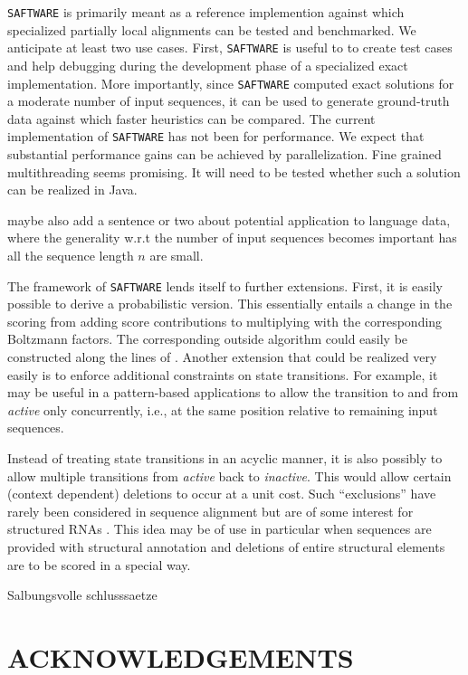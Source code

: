 \documentclass[a4paper,10pt]{article}
\let\cite\citep
\newcommand{\TODO}[1]{\begingroup\color{red}#1\endgroup}
\newcommand{\PFS}[1]{\begingroup\color{green}#1\endgroup}
\newcommand{\FK}[1]{\begingroup\color{blue}#1\endgroup}
\newcommand{\SAFTWARE}{\TODO{\texttt{SAFTWARE}}}
\begin{document}
\PFS{%
  \SAFTWARE{} is primarily meant as a reference implemention against which
  specialized partially local alignments can be tested and benchmarked. We
  anticipate at least two use cases. First, \SAFTWARE{} is useful to to
  create test cases and help debugging during the development phase of a
  specialized exact implementation. More importantly, since \SAFTWARE{}
  computed exact solutions for a moderate number of input sequences, it can
  be used to generate ground-truth data against which faster heuristics can
  be compared. \FK{ The current implementation of \SAFTWARE{} has not been
    for performance.  We expect that substantial performance gains can be
    achieved by parallelization. Fine grained multithreading
    \cite{Martins:01} seems promising. It will need to be tested whether
    such a solution can be realized in Java.}

  \TODO{maybe also add a sentence or two about potential application to
    language data, where the generality w.r.t the number of input sequences
    becomes important has all the sequence length $n$ are small.}

  The framework of \SAFTWARE{} lends itself to further extensions. First,
  it is easily possible to derive a probabilistic version. This essentially
  entails a change in the scoring from adding score contributions to
  multiplying with the corresponding Boltzmann factors. The corresponding
  outside algorithm could easily be constructed along the lines of
  \citet{Hoener:15b}. Another extension that could be realized very easily
  is to enforce additional constraints on state transitions. For example,
  it may be useful in a pattern-based applications to allow the transition
  to and from \textit{active} only concurrently, i.e., at the same position
  relative to remaining input sequences.

  Instead of treating state transitions in an acyclic manner, it is also
  possibly to allow multiple transitions from \textit{active} back to
  \textit{inactive}. This would allow certain (context dependent) deletions
  to occur at a unit cost. Such ``exclusions'' have rarely been considered
  in sequence alignment but are of some interest for structured RNAs
  \cite{Schirmer:13}. This idea may be of use in particular when sequences
  are provided with structural annotation and deletions of entire
  structural elements are to be scored in a special way.  }

\TODO{Salbungsvolle schlusssaetze}

\section*{\uppercase{Acknowledgements}}
\end{document}
